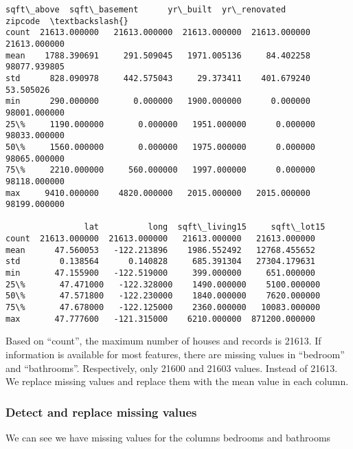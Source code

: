 \documentclass[11pt]{article}
\begin{document}
\begin{tcolorbox}[breakable, size=fbox, boxrule=.5pt, pad at break*=1mm, opacityfill=0]
\begin{Verbatim}[commandchars=\\\{\}]
         sqft\_above  sqft\_basement      yr\_built  yr\_renovated       zipcode  \textbackslash{}
count  21613.000000   21613.000000  21613.000000  21613.000000  21613.000000
mean    1788.390691     291.509045   1971.005136     84.402258  98077.939805
std      828.090978     442.575043     29.373411    401.679240     53.505026
min      290.000000       0.000000   1900.000000      0.000000  98001.000000
25\%     1190.000000       0.000000   1951.000000      0.000000  98033.000000
50\%     1560.000000       0.000000   1975.000000      0.000000  98065.000000
75\%     2210.000000     560.000000   1997.000000      0.000000  98118.000000
max     9410.000000    4820.000000   2015.000000   2015.000000  98199.000000

                lat          long  sqft\_living15     sqft\_lot15
count  21613.000000  21613.000000   21613.000000   21613.000000
mean      47.560053   -122.213896    1986.552492   12768.455652
std        0.138564      0.140828     685.391304   27304.179631
min       47.155900   -122.519000     399.000000     651.000000
25\%       47.471000   -122.328000    1490.000000    5100.000000
50\%       47.571800   -122.230000    1840.000000    7620.000000
75\%       47.678000   -122.125000    2360.000000   10083.000000
max       47.777600   -121.315000    6210.000000  871200.000000
\end{Verbatim}
\end{tcolorbox}
\normalsize
     
    Based on ``count'', the maximum number of houses and records is 21613.
If information is available for most features, there are missing values
in ``bedroom'' and ``bathrooms''. Respectively, only 21600 and 21603
values. Instead of 21613. We replace missing values and replace them
with the mean value in each column.

    \hypertarget{detect-and-replace-missing-values}{%
\subsubsection{Detect and replace missing
values}\label{detect-and-replace-missing-values}}

    We can see we have missing values for the columns bedrooms and bathrooms
\end{document}
